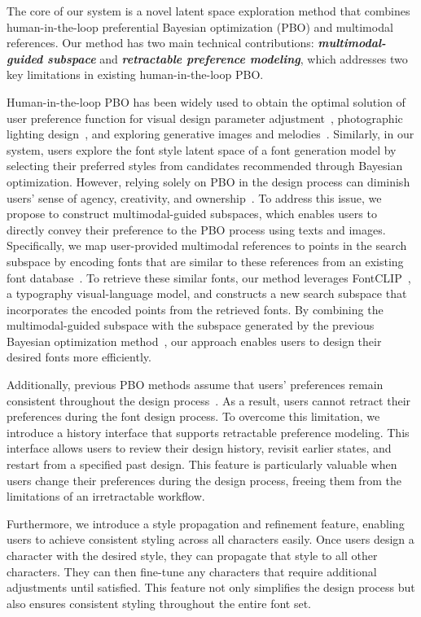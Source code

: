 The core of our system is a novel latent space exploration method that combines human-in-the-loop preferential Bayesian optimization (PBO) and multimodal references. 
Our method has two main technical contributions: \emph{\textbf{multimodal-guided subspace}} and \emph{\textbf{retractable preference modeling}}, which addresses two key limitations in existing human-in-the-loop PBO.

Human-in-the-loop PBO has been widely used to obtain the optimal solution of user preference function for visual design parameter adjustment~\cite{KoyamaSequential2017}, photographic lighting design~\cite{bayelight}, and exploring generative images and melodies~\cite{chong2021interactive,ZhouEasyGeneration2011}.
Similarly, in our system, users explore the font style latent space of a font generation model by selecting their preferred styles from candidates recommended through Bayesian optimization.
However, relying solely on PBO in the design process can diminish users' sense of agency, creativity, and ownership~\cite{Chan2022}.
To address this issue, we propose to construct multimodal-guided subspaces, which enables users to directly convey their preference to the PBO process using texts and images.
Specifically, we map user-provided multimodal references to points in the search subspace by encoding fonts that are similar to these references from an existing font database~\cite{o2014exploratory}.
To retrieve these similar fonts, our method leverages FontCLIP~\cite{tatsukawa2024fontclip}, a typography visual-language model, and constructs a new search subspace that incorporates the encoded points from the retrieved fonts.
By combining the multimodal-guided subspace with the subspace generated by the previous Bayesian optimization method~\cite{KoyamaSequential2017}, our approach enables users to design their desired fonts more efficiently.

Additionally, previous PBO methods assume that users' preferences remain consistent throughout the design process~\cite{KoyamaGallery2020}.
As a result, users cannot retract their preferences during the font design process.
To overcome this limitation, we introduce a history interface that supports retractable preference modeling.
This interface allows users to review their design history, revisit earlier states, and restart from a specified past design.
This feature is particularly valuable when users change their preferences during the design process, freeing them from the limitations of an irretractable workflow.

Furthermore, we introduce a style propagation and refinement feature, enabling users to achieve consistent styling across all characters easily.
Once users design a character with the desired style, they can propagate that style to all other characters.
They can then fine-tune any characters that require additional adjustments until satisfied.
This feature not only simplifies the design process but also ensures consistent styling throughout the entire font set.

